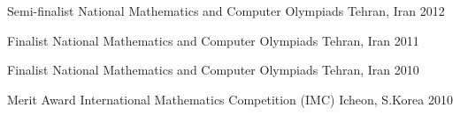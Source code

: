 \begin{cvhonors}

  \cvhonor%
    {Semi-finalist} %
    {National Mathematics and Computer Olympiads} %
    {Tehran, Iran} %
    {2012} %

  \cvhonor%
    {Finalist} %
    {National Mathematics and Computer Olympiads} %
    {Tehran, Iran} %
    {2011} %

  \cvhonor%
    {Finalist} %
    {National Mathematics and Computer Olympiads} %
    {Tehran, Iran} %
    {2010} %

  \cvhonor%
    {Merit Award} %
    {International Mathematics Competition (IMC)} %
    {Icheon, S.Korea} %
    {2010} %

\end{cvhonors}

